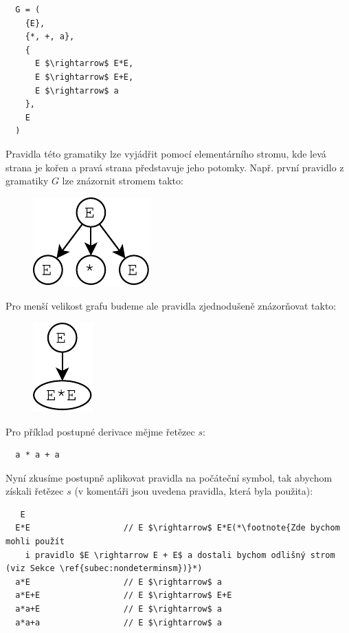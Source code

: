 \begin{lstlisting}
  G = (
    {E},
    {*, +, a},
    {
      E $\rightarrow$ E*E,
      E $\rightarrow$ E+E,
      E $\rightarrow$ a
    },
    E
  )
\end{lstlisting}
\noindent
Pravidla této gramatiky lze vyjádřit pomocí elementárního stromu,
kde levá strana je kořen a pravá strana představuje jeho potomky.
Např. první pravidlo z gramatiky $G$ lze znázornit stromem takto:
\begin{figure}[H]
  \centering
  \includegraphics{fig/RuleTree1.pdf}
\end{figure}

\noindent
Pro menší velikost grafu budeme ale pravidla zjednodušeně znázorňovat takto:

\begin{figure}[H]
  \centering
  \includegraphics{fig/RuleTree2.pdf}
\end{figure}

\noindent
Pro příklad postupné derivace mějme řetězec $s$:

\begin{lstlisting}
  a * a + a
\end{lstlisting}

\noindent
Nyní zkusíme postupně aplikovat pravidla na počáteční symbol,
tak abychom získali řetězec $s$
(v komentáři jsou uvedena pravidla, která byla použita):

\begin{lstlisting}
   E
  E*E                   // E $\rightarrow$ E*E(*\footnote{Zde bychom mohli použít
    i pravidlo $E \rightarrow E + E$ a dostali bychom odlišný strom (viz Sekce \ref{subec:nondeterminsm})}*)
  a*E                   // E $\rightarrow$ a
  a*E+E                 // E $\rightarrow$ E+E
  a*a+E                 // E $\rightarrow$ a
  a*a+a                 // E $\rightarrow$ a
\end{lstlisting}

